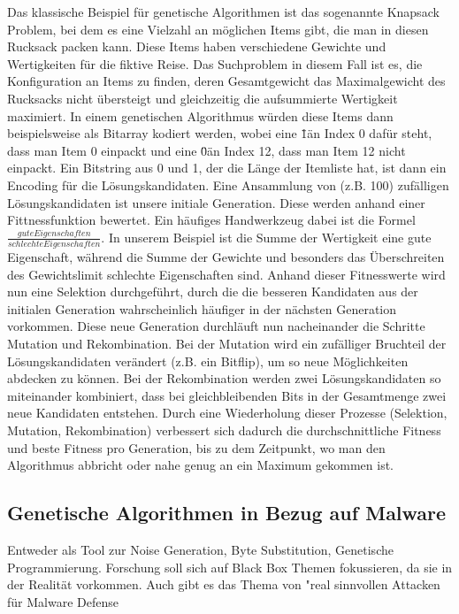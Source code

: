 Das klassische Beispiel für genetische Algorithmen ist das sogenannte Knapsack Problem, bei dem es eine Vielzahl an möglichen Items gibt, die man in diesen Rucksack packen kann. Diese Items haben verschiedene Gewichte und Wertigkeiten für die fiktive Reise. Das Suchproblem in diesem Fall ist es, die Konfiguration an Items zu finden, deren Gesamtgewicht das Maximalgewicht des Rucksacks nicht übersteigt und gleichzeitig die aufsummierte Wertigkeit maximiert.
In einem genetischen Algorithmus würden diese Items dann beispielsweise als Bitarray kodiert werden, wobei eine \"1\" an Index 0 dafür steht, dass man Item 0 einpackt und eine \"0\" an Index 12, dass man Item 12 nicht einpackt. Ein Bitstring aus 0 und 1, der die Länge der Itemliste hat, ist dann ein Encoding für die Lösungskandidaten. Eine Ansammlung von (z.B. 100) zufälligen Lösungskandidaten ist unsere initiale Generation. Diese werden anhand einer Fittnessfunktion bewertet. Ein häufiges Handwerkzeug dabei ist die Formel $ \frac{gute Eigenschaften}{schlechte Eigenschaften}$. In unserem Beispiel ist die Summe der Wertigkeit eine gute Eigenschaft, während die Summe der Gewichte und besonders das Überschreiten des Gewichtslimit schlechte Eigenschaften sind. Anhand dieser Fitnesswerte wird nun eine Selektion durchgeführt, durch die die besseren Kandidaten aus der initialen Generation wahrscheinlich häufiger in der nächsten Generation vorkommen. Diese neue Generation durchläuft nun nacheinander die Schritte Mutation und Rekombination. Bei der Mutation wird ein zufälliger Bruchteil der Lösungskandidaten verändert (z.B. ein Bitflip), um so neue Möglichkeiten abdecken zu können. Bei der Rekombination werden zwei Lösungskandidaten so miteinander kombiniert, dass bei gleichbleibenden Bits in der Gesamtmenge zwei neue Kandidaten entstehen. Durch eine Wiederholung dieser Prozesse (Selektion, Mutation, Rekombination) verbessert sich dadurch die durchschnittliche Fitness und beste Fitness pro Generation, bis zu dem Zeitpunkt, wo man den Algorithmus abbricht oder nahe genug an ein Maximum gekommen ist.

\subsection{Genetische Algorithmen in Bezug auf Malware}

Entweder als Tool zur Noise Generation, Byte Substitution, Genetische Programmierung. Forschung soll sich auf Black Box Themen fokussieren, da sie in der Realität vorkommen. Auch gibt es das Thema von "real sinnvollen Attacken für Malware Defense 